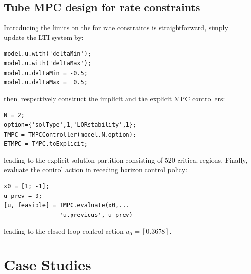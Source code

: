 \documentclass[letterpaper, 10 pt, conference]{ieeeconf}
\begin{document}


\subsection{Tube MPC design for rate constraints}
\label{sec:mptplus_tube_mpc_delta_u}

Introducing the limits on the for rate constraints is straightforward, simply update the LTI system by:
\begin{lstlisting}[style=Matlab-editor]
model.u.with('deltaMin');
model.u.with('deltaMax');
model.u.deltaMin = -0.5;
model.u.deltaMax =  0.5;
\end{lstlisting}
then, respectively construct the implicit and the explicit MPC controllers:
\begin{lstlisting}[style=Matlab-editor]
N = 2;
option={'solType',1,'LQRstability',1};
TMPC = TMPCController(model,N,option);
ETMPC = TMPC.toExplicit;
\end{lstlisting}
leading to the explicit solution partition consisting of $520$ critical regions. Finally, evaluate the control action in receding horizon control policy:
\begin{lstlisting}[style=Matlab-editor]
x0 = [1; -1];
u_prev = 0;
[u, feasible] = TMPC.evaluate(x0,...
                'u.previous', u_prev)
\end{lstlisting}
leading to the closed-loop control action $u_0 = [0.3678]$.

%

\section{Case Studies}
\label{sec:case_study}
\end{document}

